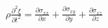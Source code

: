 \documentclass[preview]{standalone}
\begin{document}
\begin{center}
$\rho\frac{\partial^2\xi}{\partial t^2}=\frac{\partial \sigma_{xx}}{\partial x}+\frac{\partial\sigma_{xy}}{\partial y}+\frac{\partial \sigma_{xz}}{\partial z}$
\end{center}
\end{document}
